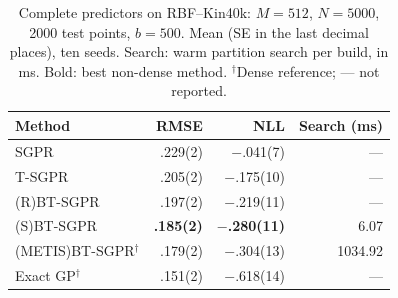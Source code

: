 \begin{table}[!ht]
\caption{Complete predictors on RBF--Kin40k: \(M=512\), \(N=5000\),
2000 test points, \(b=500\). Mean (SE in the last decimal places), ten seeds.
Search: warm partition search per build, in ms.
Bold: best non-dense method. \(^\dagger\)Dense reference; --- not reported.}
\label{tab:kin40k-sgpr}
\centering\footnotesize
\setlength{\tabcolsep}{3pt}
\begin{tabular}{@{}lrrr@{}}
\toprule
Method & RMSE & NLL & Search (ms) \\
\midrule
SGPR & .229(2) & $-$.041(7) & --- \\
T-SGPR & .205(2) & $-$.175(10) & --- \\
(R)BT-SGPR & .197(2) & $-$.219(11) & --- \\
(S)BT-SGPR & \textbf{.185(2)} & \textbf{$-$.280(11)} & 6.07 \\
\midrule
(METIS)BT-SGPR$^\dagger$ & .179(2) & $-$.304(13) & 1034.92 \\
Exact GP$^\dagger$ & .151(2) & $-$.618(14) & --- \\
\bottomrule
\end{tabular}
\end{table}
